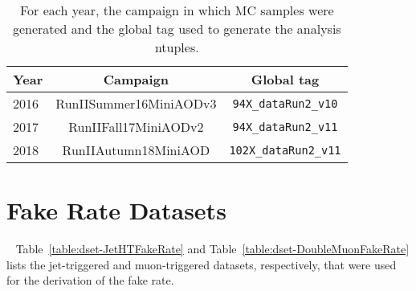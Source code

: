 \begin{table}[!htbp]
  \caption{For each year, the campaign in which MC samples were generated and the global tag used to generate the analysis ntuples.
}
  \centering
  \vspace{\baselineskip}
  \begin{tabular}{lcc}
  \hline \hline
  Year & Campaign & Global tag\\
  \hline
        2016 & RunIISummer16MiniAODv3 & \texttt{94X\_dataRun2\_v10}\\
        2017 & RunIIFall17MiniAODv2   & \texttt{94X\_dataRun2\_v11}\\
        2018 & RunIIAutumn18MiniAOD   & \texttt{102X\_dataRun2\_v11}\\
  \hline \hline
  \end{tabular}
  \label{table:mcdatasets2016-18}
\end{table}

\section{Fake Rate Datasets}~\label{FakeRateDatasets}
Table~\ref{table:dset-JetHTFakeRate} and Table~\ref{table:dset-DoubleMuonFakeRate} lists the jet-triggered and muon-triggered datasets, respectively, that were used for the derivation of the fake rate.

